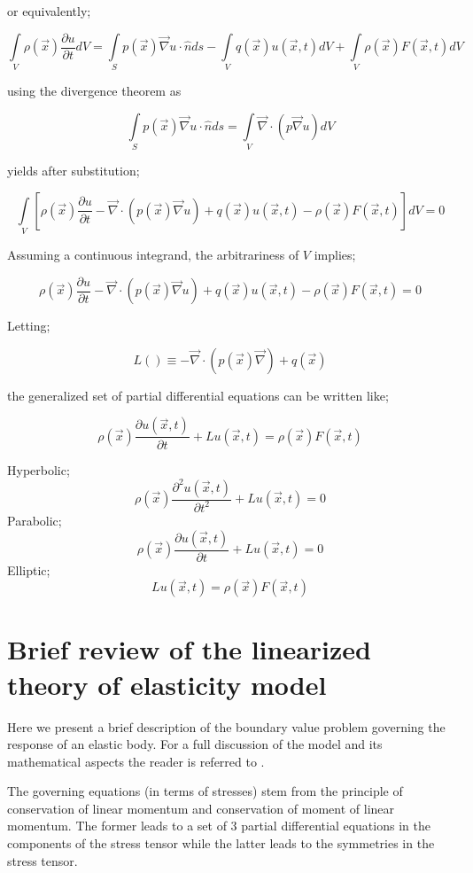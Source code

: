 or equivalently;

\[\int\limits_V {\rho (\vec x)\frac{{\partial u}}{{\partial t}}dV = \int\limits_S {p(\vec x)\vec \nabla u \cdot \hat nds} }  - \int\limits_V {q(\vec x)u(\vec x,t)dV}  + \int\limits_V {\rho (\vec x)F(\vec x,t)dV} \]

using the divergence theorem as

\[\int\limits_S {p(\vec x)\vec \nabla u \cdot \hat nds}  = \int\limits_V {\vec \nabla  \cdot \left( {p\vec \nabla u} \right)dV} \]

yields after substitution;

\[\int\limits_V {\left[ {\rho (\vec x)\frac{{\partial u}}{{\partial t}} - \vec \nabla  \cdot \left( {p(\vec x)\vec \nabla u} \right) + q(\vec x)u(\vec x,t) - \rho (\vec x)F(\vec x,t)} \right]dV}  = 0\]

Assuming a continuous integrand, the arbitrariness of $V$ implies;

\[
\rho (\vec x)\frac{{\partial u}}{{\partial t}} - \vec \nabla  \cdot \left( {p(\vec x)\vec \nabla u} \right) + q(\vec x)u(\vec x,t) - \rho (\vec x)F(\vec x,t) = 0
\]

Letting;

\[L() \equiv  - \vec \nabla  \cdot \left( {p(\vec x)\vec \nabla } \right) + q(\vec x)\]

the generalized set of partial differential equations can be written like;

\begin{equation}
\rho (\vec x)\frac{{\partial u(\vec x,t)}}{{\partial t}} + Lu(\vec x,t) = \rho (\vec x)F(\vec x,t)
\label{GenPDE}
\end{equation}

Hyperbolic;
\[\rho (\vec x)\frac{{{\partial ^2}u(\vec x,t)}}{{\partial {t^2}}} + Lu(\vec x,t) = 0\]
Parabolic;
\[\rho (\vec x)\frac{{\partial u(\vec x,t)}}{{\partial t}} + Lu(\vec x,t) = 0\]
Elliptic;
\[Lu(\vec x,t) = \rho (\vec x)F(\vec x,t)\]
\section{Brief review of the linearized theory of elasticity model}
Here we present a brief description of the boundary value problem governing the response of an elastic body. For a full discussion of the model and its mathematical aspects the reader is referred to \cite{shames1997elastic}.

The governing equations (in terms of stresses) stem from the principle of conservation of linear momentum and conservation of moment of linear momentum. The former leads to a set of 3 partial differential equations in the components of the stress tensor while the latter leads to the symmetries in the stress tensor.

